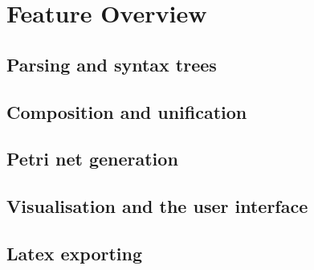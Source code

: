\documentclass[../Dissertation.tex]{subfiles}
\begin{document}
\section{Feature Overview}
\subsection{Parsing and syntax trees}


\subsection{Composition and unification}
\subsection{Petri net generation}
\subsection{Visualisation and the user interface}
\subsection{Latex exporting}
\end{document}
